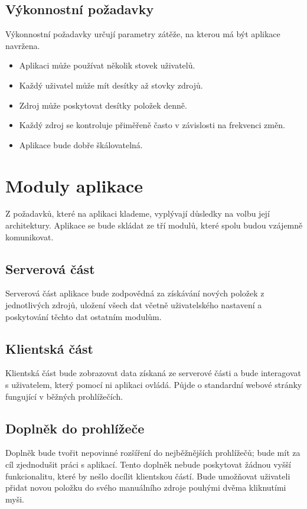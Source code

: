 \subsection{Výkonnostní požadavky}

Výkonnostní požadavky určují parametry zátěže, na kterou má být aplikace navržena.

\begin{itemize}
	\item Aplikaci může používat několik stovek uživatelů.
    \item Každý uživatel může mít desítky až stovky zdrojů.
	\item Zdroj může poskytovat desítky položek denně.
    \item Každý zdroj se kontroluje přiměřeně často v závislosti na frekvenci změn.
    \item Aplikace bude dobře škálovatelná.
\end{itemize}

\section{Moduly aplikace}

Z požadavků, které na aplikaci klademe, vyplývají důsledky na volbu její architektury.
Aplikace se bude skládat ze tří modulů, které spolu budou vzájemně komunikovat.

\subsection{Serverová část}

Serverová část aplikace bude zodpovědná za získávání nových položek z jednotlivých zdrojů, uložení všech dat včetně uživatelského nastavení a poskytování těchto dat ostatním modulům.

\subsection{Klientská část}

Klientská část bude zobrazovat data získaná ze serverové části a bude interagovat s uživatelem, který pomocí ni aplikaci ovládá.
Půjde o standardní webové stránky fungující v běžných prohlížečích.

\subsection{Doplněk do prohlížeče}

Doplněk bude tvořit nepovinné rozšíření do nejběžnějších prohlížečů; bude mít za cíl zjednodušit práci s aplikací.
Tento doplněk nebude poskytovat žádnou vyšší funkcionalitu, které by nešlo docílit klientskou částí.
Bude umožňovat uživateli přidat novou položku do svého manuálního zdroje pouhými dvěma kliknutími myši.

